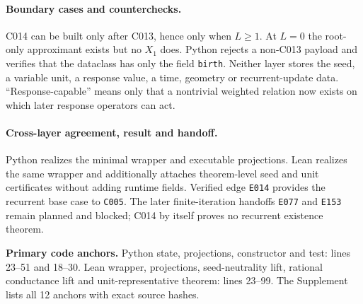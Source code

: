 \paragraph*{Boundary cases and counterchecks.}
C014 can be built only after C013, hence only when $L\ge1$.  At $L=0$ the
root-only approximant exists but no $X_1$ does.  Python rejects a non-C013
payload and verifies that the dataclass has only the field \texttt{birth}.
Neither layer stores the seed, a variable unit, a response value, a time,
geometry or recurrent-update data.  ``Response-capable'' means only that a
nontrivial weighted relation now exists on which later response operators can
act.

\paragraph*{Cross-layer agreement, result and handoff.}
Python realizes the minimal wrapper and executable projections.  Lean realizes
the same wrapper and additionally attaches theorem-level seed and unit
certificates without adding runtime fields.  Verified edge \texttt{E014}
provides the recurrent base case to \texttt{C005}.  The later finite-iteration
handoffs \texttt{E077} and \texttt{E153} remain planned and blocked; C014 by
itself proves no recurrent existence theorem.

\noindent\textbf{Primary code anchors.}
Python state, projections, constructor and test: lines 23--51 and 18--30.
Lean wrapper, projections, seed-neutrality lift, rational conductance lift and
unit-representative theorem: lines 23--99.  The Supplement lists all 12 anchors
with exact source hashes.
